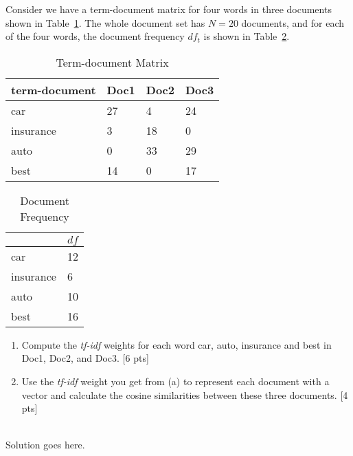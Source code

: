 Consider we have a term-document matrix for four words in three documents shown in Table~\ref{Tab:term_doc}. The whole document set has $N = 20$ documents, and for each of the four words, the document frequency $df_t$ is shown in Table~\ref{Tab:doc_freq}.

\begin{table}[h]
\centering
\begin{tabular}{|l|l|l|l|}
\hline
term-document       & Doc1 & Doc2 & Doc3 \\ \hline
car       & 27   & 4    & 24   \\ \hline
insurance & 3    & 18   & 0    \\ \hline
auto      & 0    & 33   & 29   \\ \hline
best      & 14   & 0    & 17   \\ \hline
\end{tabular}\caption{Term-document Matrix} \label{Tab:term_doc}
\end{table}

\begin{table}[h]
\centering
\begin{tabular}{|l|l|}
\hline
          & $df$ \\ \hline
car       & 12 \\ \hline
insurance & 6  \\ \hline
auto      & 10 \\ \hline
best      & 16 \\ \hline
\end{tabular} \caption{Document Frequency} \label{Tab:doc_freq}
\end{table}

\begin{enumerate}
    \item Compute the \textit{tf-idf} weights for each word car, auto,
insurance and best in Doc1, Doc2, and Doc3.  [6 pts]
    \item Use the \textit{tf-idf} weight you get from (a) to represent each document with a vector and calculate the cosine similarities between these three documents. [4 pts]
\end{enumerate}

\begin{solution} \ \\
Solution goes here.
\end{solution}
